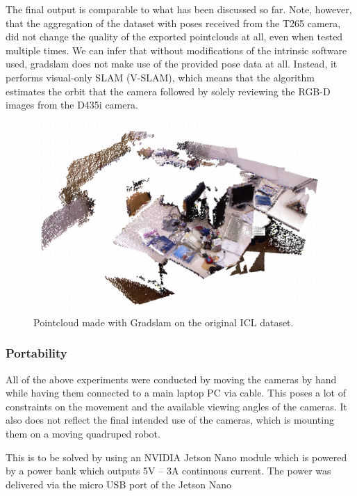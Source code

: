 \documentclass{article}
\begin{document}
The final output is comparable to what has been discussed so far. Note, however, that the aggregation of the dataset with poses received from the T265 camera, did not change the quality of the exported pointclouds at all, even when tested multiple times. We can infer that without modifications of the intrinsic software used, gradslam does not make use of the provided pose data at all. Instead, it performs visual-only SLAM (V-SLAM), which means that the algorithm estimates the orbit that the camera followed by solely reviewing the RGB-D images from the D435i camera.

\begin{figure}[h] %
    \centering
	\includegraphics[width=\textwidth,height=\textheight,keepaspectratio]{report1-img021.png} %
	\caption{Pointcloud made with Gradslam on the original ICL dataset. }
\end{figure}

\subsubsection{Portability}

All of the above experiments were conducted by moving the cameras by hand while having them connected to a main laptop PC via cable. This poses a lot of constraints on the movement and the available viewing angles of the cameras. It also does not reflect the final intended use of the cameras, which is mounting them on a moving quadruped robot. 

This is to be solved by using an NVIDIA Jetson Nano module which is powered by a power bank which outputs 5V – 3A continuous current. The power was delivered via the micro USB port of the Jetson Nano
\end{document}
